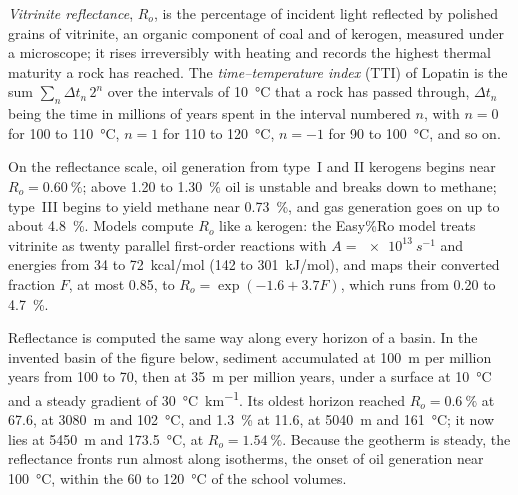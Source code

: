 \begin{definition}\label{def:b2:energy-geology:maturity}
\emph{Vitrinite reflectance}, $R_o$, is the percentage of incident
light reflected by polished grains of vitrinite, an organic component of coal and of kerogen,
measured under a microscope; it rises irreversibly with heating and records the highest thermal maturity a rock has reached. The
\emph{time--temperature index} (TTI) of Lopatin is the sum
$\sum_n \Delta t_n\,2^n$ over the intervals of \qty{10}{\celsius} that a rock has passed through,
$\Delta t_n$ being the time in millions of years spent in the interval numbered $n$, with $n = 0$
for 100 to \qty{110}{\celsius}, $n = 1$ for 110 to \qty{120}{\celsius}, $n = -1$ for 90 to
\qty{100}{\celsius}, and so on.
\end{definition}

On the reflectance scale, oil generation from type~I and II kerogens begins near $R_o =
\qty{0.60}{\percent}$; above 1.20 to \qty{1.30}{\percent} oil is unstable and breaks down to
methane; type~III begins to yield methane near \qty{0.73}{\percent}, and gas generation goes on up
to about \qty{4.8}{\percent}. Models compute $R_o$ like a kerogen: the Easy\%Ro model
treats vitrinite as twenty parallel first-order reactions with $A = \qty{e13}{s^{-1}}$ and energies
from 34 to \qty{72}{kcal/mol} (142 to \qty{301}{kJ/mol}), and maps their converted fraction $F$,
at most 0.85, to $R_o = \exp(-1.6 + 3.7F)$, which runs from 0.20 to \qty{4.7}{\percent}.

Reflectance is computed the same way along every horizon of a basin. In the invented basin of the
figure below, sediment accumulated at \qty{100}{m} per million years from 100 to \qty{70}{\Ma},
then at \qty{35}{m} per million years, under a surface at \qty{10}{\celsius} and a steady gradient
of \qty{30}{\celsius\per\km}. Its oldest horizon reached $R_o = \qty{0.6}{\percent}$ at
\qty{67.6}{\Ma}, at \qty{3080}{m} and \qty{102}{\celsius}, and \qty{1.3}{\percent} at
\qty{11.6}{\Ma}, at \qty{5040}{m} and \qty{161}{\celsius}; it now lies at \qty{5450}{m} and
\qty{173.5}{\celsius}, at $R_o = \qty{1.54}{\percent}$. Because the geotherm is steady, the
reflectance fronts run almost along isotherms, the onset of oil generation near
\qty{100}{\celsius}, within the 60 to \qty{120}{\celsius} of the school volumes.

